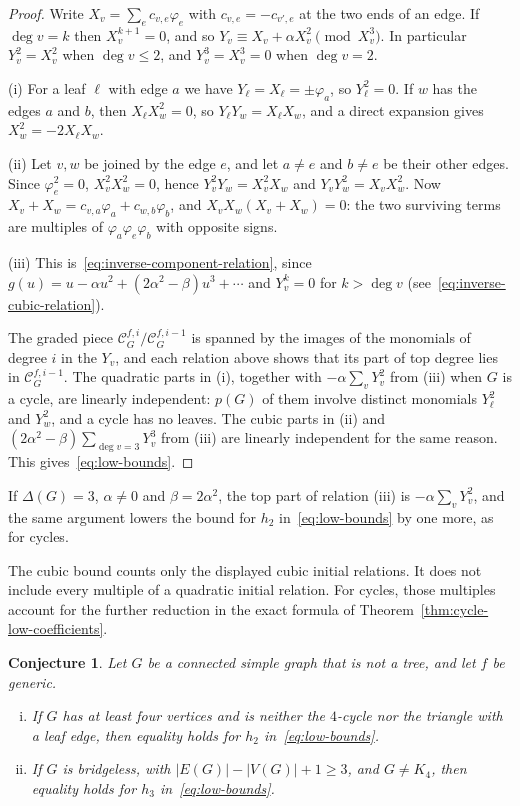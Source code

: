 \documentclass[reqno]{article}
\theoremstyle{plain} %
\newtheorem{conjecture}[theorem]{Conjecture}
\theoremstyle{definition}
\theoremstyle{remark}
\newcommand {\CC}{\mathscr{C}}
\numberwithin{equation}{section}
\begin{document}
\begin{proof}
  Write $X_v=\sum_e c_{v,e}\varphi_e$ with $c_{v,e}=-c_{v',e}$ at the two ends of an edge.
  If $\deg v=k$ then $X_v^{k+1}=0$, and so
$Y_v\equiv X_v+\alpha X_v^2\pmod{X_v^3}$. In particular
$Y_v^2=X_v^2$ when $\deg v\le2$, and $Y_v^3=X_v^3=0$ when $\deg v=2$.

(i) For a leaf $\ell$ with edge $a$ we have $Y_\ell=X_\ell=\pm\varphi_a$,
so $Y_\ell^2=0$. If $w$ has the edges $a$ and $b$, then
$X_\ell X_w^2=0$, so $Y_\ell Y_w=X_\ell X_w$, and a direct expansion gives
$X_w^2=-2X_\ell X_w$.

(ii) Let $v,w$ be joined by the edge $e$, and let $a\ne e$ and $b\ne e$ be
their other edges. Since $\varphi_e^2=0$, $X_v^2X_w^2=0$, hence
$Y_v^2Y_w=X_v^2X_w$ and $Y_vY_w^2=X_vX_w^2$. Now
$X_v+X_w=c_{v,a}\varphi_a+c_{w,b}\varphi_b$, and
$X_vX_w(X_v+X_w)=0$: the two surviving terms are multiples of
$\varphi_a\varphi_e\varphi_b$ with opposite signs.

(iii) This is~\eqref{eq:inverse-component-relation}, since
$g(u)=u-\alpha u^2+(2\alpha^2-\beta)u^3+\cdots$ and $Y_v^k=0$ for
$k>\deg v$ (see~\eqref{eq:inverse-cubic-relation}).

The graded piece $\CC^{f,i}_G/\CC^{f,i-1}_G$ is spanned by the images
of the monomials of degree $i$ in the $Y_v$, and each relation above
shows that its part of top degree lies in $\CC^{f,i-1}_G$. The quadratic
parts in (i), together with $-\alpha\sum_vY_v^2$ from (iii) when $G$ is a
cycle, are linearly independent: $p(G)$ of them involve distinct
monomials $Y_\ell^2$ and $Y_w^2$, and a cycle has no leaves. The cubic
parts in (ii) and $(2\alpha^2-\beta)\sum_{\deg v=3}Y_v^3$ from (iii) are
linearly independent for the same reason. This gives~\eqref{eq:low-bounds}.
\end{proof}

If $\Delta(G)=3$, $\alpha\ne0$ and $\beta=2\alpha^2$, the top part of
relation (iii) is $-\alpha\sum_vY_v^2$, and the same argument lowers the
bound for $h_2$ in~\eqref{eq:low-bounds} by one more, as for cycles.

The cubic bound counts only the displayed cubic initial relations. It
does not include every multiple of a quadratic initial relation. For
cycles, those multiples account for the further reduction in the exact
formula of Theorem~\ref{thm:cycle-low-coefficients}.

\begin{conjecture}\label{conj:low-coefficients}
Let $G$ be a connected simple graph that is not a tree, and let $f$ be
generic.
\begin{enumerate}[(i)]
\item If $G$ has at least four vertices and is neither the $4$-cycle
nor the triangle with a leaf edge, then equality holds for $h_2$
in~\eqref{eq:low-bounds}.
\item If $G$ is bridgeless, with $|E(G)|-|V(G)|+1\ge3$, and
$G\ne K_4$, then equality holds for $h_3$ in~\eqref{eq:low-bounds}.
\end{enumerate}
\end{conjecture}
\end{document}

